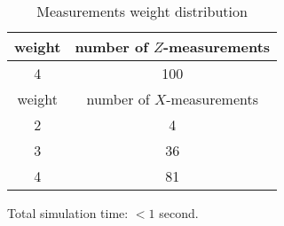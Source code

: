\documentclass[12pt]{article}
\begin{document}
\begin{table}[h]
\centering
\begin{tabular}{c c}
\hline
weight & number of $Z$-measurements\\
\hline
4 & 100\\
\hline
\hline
weight & number of $X$-measurements\\
\hline
2 & 4\\
3 & 36\\
4 & 81\\
\hline
\end{tabular}
\caption{Measurements weight distribution}
\end{table}
\vspace{.3cm}



\vspace{2cm}
Total simulation time: $< 1$ second.
\end{document}
